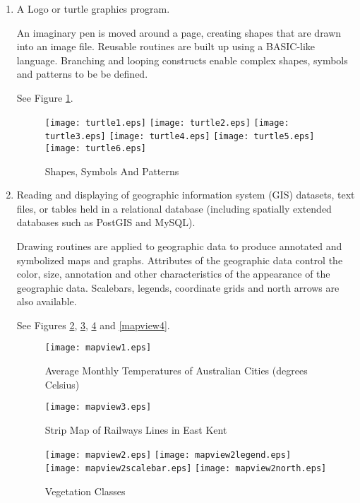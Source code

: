 \begin{enumerate}
\item

A Logo or turtle graphics program.

An imaginary pen is moved around a page,
creating shapes that are drawn into an image file.
Reusable routines are built up using a BASIC-like language.
Branching and looping constructs enable complex shapes, symbols and patterns
to be be defined.

See Figure \ref{turtle}.

\begin{figure}[htb]
\texttt{[image: turtle1.eps]}
\texttt{[image: turtle2.eps]}
\texttt{[image: turtle3.eps]}
\texttt{[image: turtle4.eps]}
\texttt{[image: turtle5.eps]}
\texttt{[image: turtle6.eps]}
\caption{Shapes, Symbols And Patterns}
\label{turtle}
\end{figure}

\item

Reading and displaying of geographic information
system (GIS) datasets, text files, or tables held in a relational database
(including spatially extended databases such as PostGIS and MySQL).

Drawing routines are applied to geographic data to produce annotated and
symbolized maps and graphs.  Attributes of the geographic data control
the color, size, annotation and other characteristics of the
appearance of the geographic data.
Scalebars, legends, coordinate grids and north arrows are also available.

See Figures \ref{mapview1}, \ref{mapview3}, \ref{mapview2} and
\ref{mapview4}.

\begin{figure}
\texttt{[image: mapview1.eps]}
\caption[Average Monthly Temperatures]{Average Monthly Temperatures of Australian Cities (degrees Celsius)}
\label{mapview1}
\end{figure}

\begin{figure}
\texttt{[image: mapview3.eps]}
\caption{Strip Map of Railways Lines in East Kent}
\label{mapview3}
\end{figure}

\begin{figure}

\texttt{[image: mapview2.eps]}
\texttt{[image: mapview2legend.eps]}
\vspace{1pt}
\texttt{[image: mapview2scalebar.eps]}
\texttt{[image: mapview2north.eps]}
\caption{Vegetation Classes}
\label{mapview2}
\end{figure}


\end{enumerate}
